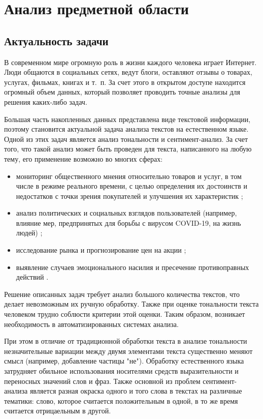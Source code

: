 \chapter{Анализ предметной области}

\section{Актуальность задачи}

В современном мире огромную роль в жизни каждого человека играет Интернет.
Люди общаются в социальных сетях, ведут блоги, оставляют отзывы о товарах,
услугах, фильмах, книгах и т.~п. За счет этого в открытом доступе находится
огромный объем данных, который позволяет проводить точные анализы для
решения каких-либо задач.  

Большая часть накопленных данных представлена виде текстовой информации, поэтому
становится актуальной задача анализа текстов на естественном языке.
\cite{article8} Одной из этих задач является анализ тональности и
сентимент-анализ. За счет того, что такой анализ может быть проведен для
текста, написанного на любую тему, его применение возможно во многих сферах:
\begin{itemize}
    \item мониторинг общественного мнения \cite{article1} относительно товаров и
        услуг, в том числе в режиме реального времени, с целью определения их
        достоинств и недостатков с точки зрения покупателей и улучшения их
        характеристик \cite{article3};
    \item анализ политических и социальных взглядов пользователей (например,
        влияние мер, предпринятых для борьбы с вирусом COVID-19, на жизнь
        людей) \cite{article3};
    \item исследование рынка и прогнозирование цен на акции
        \cite{article3};
    \item выявление случаев эмоционального насилия и пресечение
        противоправных действий \cite{article6}.
\end{itemize}

Решение описанных задач требует анализ большого количества текстов, что
делает невозможным их ручную обработку. Также при оценке тональности текста
человеком трудно соблюсти критерии этой оценки. Таким образом, возникает
необходимость в автоматизированных системах анализа.

При этом в отличие от традиционной обработки текста в анализе тональности
незначительные вариации между двумя элементами текста существенно меняют смысл
(например, добавление частицы "не"). Обработку естественного языка затрудняет
обильное использования носителями средств выразительности и переносных значений
слов и фраз. Также основной из проблем сентимент-анализа является разная окраска
одного и того слова в текстах на различные тематики: слово, которое считается
положительным в одной, в то же время считается отрицаельным в другой.

